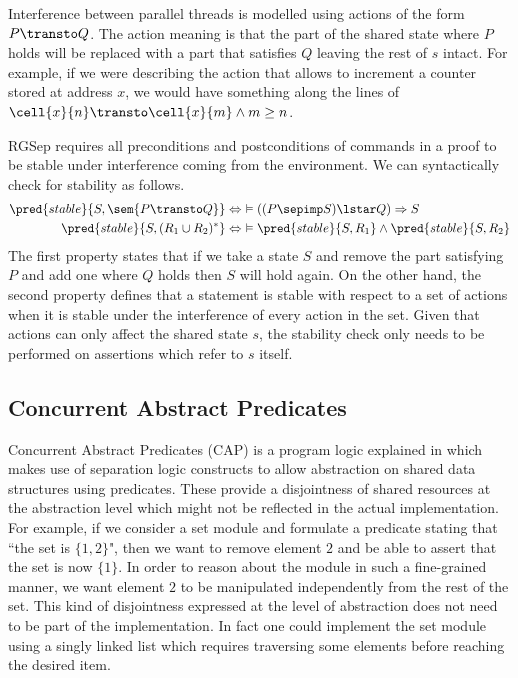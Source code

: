 Interference between parallel threads is modelled using actions of the form $P \transto Q$. The action meaning is that the part of the shared state where $P$ holds will be replaced with a part that satisfies $Q$ leaving the rest of $s$ intact. For example, if we were describing the action that allows to increment a counter stored at address $x$, we would have something along the lines of $\cell{x}{n} \transto \cell{x}{m} \land m \geq n$.

RGSep requires all preconditions and postconditions of commands in a proof to be stable under interference coming from the environment. We can syntactically check for stability as follows.
\begin{align*}
\pred{stable}{S, \sem{P \transto Q}} &\Leftrightarrow\ \vDash ((P \sepimp S) \lstar Q) \Rightarrow S
\\
\pred{stable}{S, (R_1 \cup R_2)^*} &\Leftrightarrow\ \vDash \pred{stable}{S, R_1} \land \pred{stable}{S, R_2}
\end{align*}
The first property states that if we take a state $S$ and remove the part satisfying $P$ and add one where $Q$ holds then $S$ will hold again. On the other hand, the second property defines that a statement is stable with respect to a set of actions when it is stable under the interference of every action in the set. Given that actions can only affect the shared state $s$, the stability check only needs to be performed on assertions which refer to $s$ itself. \\

\tocless\subsection{Concurrent Abstract Predicates}

\label{sec:cap}

Concurrent Abstract Predicates (CAP) is a program logic explained in \cite{cap} which makes use of separation logic constructs to allow abstraction on shared data structures using predicates. These provide a disjointness of shared resources at the abstraction level which might not be reflected in the actual implementation. For example, if we consider a set module and formulate a predicate stating that ``the set is $\{ 1,2 \}$", then we want to remove element $2$ and be able to assert that the set is now $\{ 1 \}$. In order to reason about the module in such a fine-grained manner, we want element $2$ to be manipulated independently from the rest of the set. This kind of disjointness expressed at the level of abstraction does not need to be part of the implementation. In fact one could implement the set module using a singly linked list which requires traversing some elements before reaching the desired item.

